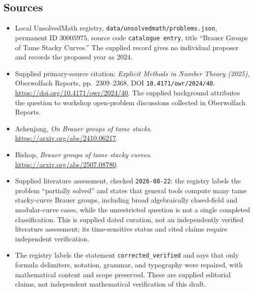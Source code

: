 \documentclass[11pt]{article}
\begin{document}
\subsection{Sources}
\begin{itemize}
\item Local UnsolvedMath registry, \texttt{data/unsolvedmath/problems.json}, permanent ID \(30005975\), source code \texttt{catalogue entry}, title ``Brauer Groups of Tame Stacky Curves.'' The supplied record gives no individual proposer and records the proposed year as \(2024\).
\item Supplied primary-source citation: \emph{Explicit Methods in Number Theory (2025)}, Oberwolfach Reports, pp.\ 2309--2368, DOI \texttt{10.4171/owr/2024/40}. \url{https://doi.org/10.4171/owr/2024/40}. The supplied background attributes the question to workshop open-problem discussions collected in Oberwolfach Reports.
\item Achenjang, \emph{On Brauer groups of tame stacks}. \url{https://arxiv.org/abs/2410.06217}.
\item Bishop, \emph{Brauer groups of tame stacky curves}. \url{https://arxiv.org/abs/2507.08780}.
\item Supplied literature assessment, checked \texttt{2026-08-22}: the registry labels the problem ``partially solved'' and states that general tools compute many tame stacky-curve Brauer groups, including broad algebraically closed-field and modular-curve cases, while the unrestricted question is not a single completed classification. This is supplied dated curation, not an independently verified literature assessment; its time-sensitive status and cited claims require independent verification.
\item The registry labels the statement \texttt{corrected\_verified} and says that only formula delimiters, notation, grammar, and typography were repaired, with mathematical content and scope preserved. These are supplied editorial claims, not independent mathematical verification of this draft.
\end{itemize}
\end{document}
